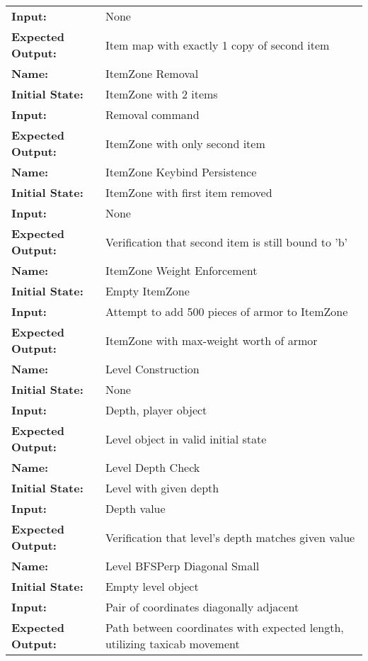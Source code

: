 \documentclass[12pt, titlepage]{article}
\begin{document}
\begin{center}
\begin{longtable}{ l | p{10cm} }
				\textbf{Input:} & None\\
				\textbf{Expected Output:} & Item map with exactly 1 copy of second item\\[1em]
				\hline
				\rule{0pt}{2em}\textbf{Name:} & ItemZone Removal\\
				\textbf{Initial State:} & ItemZone with 2 items\\
				\textbf{Input:} & Removal command\\
				\textbf{Expected Output:} & ItemZone with only second item\\[1em]
				\hline
				\rule{0pt}{2em}\textbf{Name:} & ItemZone Keybind Persistence\\
				\textbf{Initial State:} & ItemZone with first item removed\\
				\textbf{Input:} & None\\
				\textbf{Expected Output:} & Verification that second item is still bound to 'b'\\[1em]
				\hline
				\rule{0pt}{2em}\textbf{Name:} & ItemZone Weight Enforcement\\
				\textbf{Initial State:} & Empty ItemZone\\
				\textbf{Input:} & Attempt to add 500 pieces of armor to ItemZone\\
				\textbf{Expected Output:} & ItemZone with max-weight worth of armor\\[1em]
				\hline
				\rule{0pt}{2em}\textbf{Name:} & Level Construction\\
				\textbf{Initial State:} & None\\
				\textbf{Input:} & Depth, player object\\
				\textbf{Expected Output:} & Level object in valid initial state\\[1em]
				\hline
				\rule{0pt}{2em}\textbf{Name:} & Level Depth Check\\
				\textbf{Initial State:} & Level with given depth\\
				\textbf{Input:} & Depth value\\
				\textbf{Expected Output:} & Verification that level's depth matches given value\\[1em]
				\hline
				\rule{0pt}{2em}\textbf{Name:} & Level BFSPerp Diagonal Small\\
				\textbf{Initial State:} & Empty level object\\
				\textbf{Input:} & Pair of coordinates diagonally adjacent\\
				\textbf{Expected Output:} & Path between coordinates with expected length, utilizing taxicab movement\\[1em]

\end{longtable}
\end{center}
\end{document}

